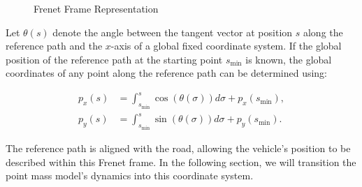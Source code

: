 \begin{figure}[h]
	\centering
	\caption{Frenet Frame Representation}
	\label{fig:frenet_frame}
\end{figure}

Let $\theta(s)$ denote the angle between the tangent vector at position $s$ along the reference path and the $x$-axis of a global fixed coordinate
system.
If the global position of the reference path at the starting point $s_{\min}$ is known, the global coordinates of any point along the reference path can be determined using:

\begin{align}
	p_x(s) & = \int_{s_{\min}}^{s} \cos(\theta(\sigma)) d\sigma + p_x(s_{\min}), \\
	p_y(s) & = \int_{s_{\min}}^{s} \sin(\theta(\sigma)) d\sigma + p_y(s_{\min}).
\end{align}

The reference path is aligned with the road, allowing the vehicle's position to be described within this Frenet frame.
In the following section, we will transition the point mass model's dynamics into this coordinate system.

